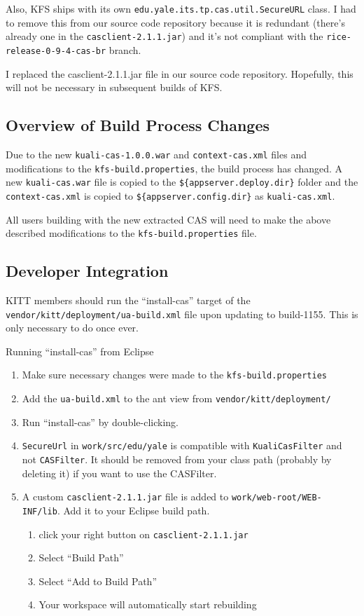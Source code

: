\documentclass[12pt,notitlepage]{article}
\begin{document}
Also, KFS ships with its own \verb|edu.yale.its.tp.cas.util.SecureURL| class. I had to remove this
from our source code repository because it is redundant (there's already one in the \verb|casclient-2.1.1.jar|)
and it's not compliant with the \verb|rice-release-0-9-4-cas-br| branch.

I replaced the casclient-2.1.1.jar file in our source code repository. Hopefully, this will not be necessary
in subsequent builds of KFS.

\subsection{Overview of Build Process Changes}
Due to the new \verb|kuali-cas-1.0.0.war| and \verb|context-cas.xml| files and modifications
to the \verb|kfs-build.properties|, the build process has changed. A new \verb|kuali-cas.war| file is
copied to the \verb|${appserver.deploy.dir}| folder and the \verb|context-cas.xml| is copied to
\verb|${appserver.config.dir}| as \verb|kuali-cas.xml|.

All users building with the new extracted CAS will need to make the above described modifications
to the \verb|kfs-build.properties| file.

\subsection{Developer Integration}
KITT members should run the ``install-cas'' target of the \verb|vendor/kitt/deployment/ua-build.xml| file upon updating to build-1155. 
This is only necessary to do once ever. 

Running ``install-cas'' from Eclipse

\begin{enumerate}
  \item Make sure necessary changes were made to the \verb|kfs-build.properties|
  \item Add the \verb|ua-build.xml| to the ant view from \verb|vendor/kitt/deployment/|
  \item Run ``install-cas'' by double-clicking.
  \item \verb|SecureUrl| in \verb|work/src/edu/yale| is compatible with \verb|KualiCasFilter|
    and not \verb|CASFilter|. It should be removed from your class path (probably by deleting it)
    if you want to use the CASFilter.
  \item A custom \verb|casclient-2.1.1.jar| file is added to \verb|work/web-root/WEB-INF/lib|. Add it
    to your Eclipse build path.
    \begin{enumerate}
      \item click your right button on \verb|casclient-2.1.1.jar|
      \item Select ``Build Path''
      \item Select ``Add to Build Path''
      \item Your workspace will automatically start rebuilding
    \end{enumerate}
\end{enumerate}
\end{document}
